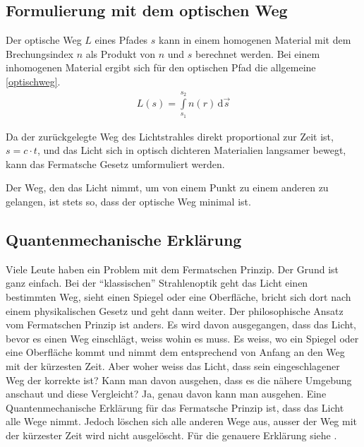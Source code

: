 \subsection{Formulierung mit dem optischen Weg}
Der optische Weg $L$  eines Pfades $s$ kann in einem homogenen Material 
mit dem Brechungsindex $n$ als Produkt von $n$ und $s$ berechnet werden.
Bei einem inhomogenen Material ergibt sich für den optischen Pfad die allgemeine \eqref{optischweg}.
\begin{align}
	L(s) = \int\limits_{s_1}^{s_2} n(r) \,\mathrm d\vec s 
	\label{optischweg}
\end{align}

Da der zurückgelegte Weg des Lichtstrahles direkt proportional zur Zeit ist, $s = c \cdot t$,
und das Licht sich in optisch dichteren Materialien langsamer bewegt,
kann das Fermatsche Gesetz umformuliert werden\cite{Definition}. 


\begin{definition}
Der Weg, den das Licht nimmt, um von einem Punkt zu einem anderen zu gelangen, ist stets so, dass der optische Weg minimal ist.
\end{definition}

\subsection{Quantenmechanische Erklärung}
Viele Leute haben ein Problem mit dem Fermatschen Prinzip. 
Der Grund ist ganz einfach. 
Bei der ``klassischen'' Strahlenoptik geht das Licht einen bestimmten Weg, 
sieht einen Spiegel oder eine Oberfläche, bricht sich dort nach einem 
physikalischen Gesetz und geht dann weiter.
Der philosophische Ansatz vom Fermatschen Prinzip ist anders. 
Es wird davon ausgegangen, dass das Licht, bevor es einen Weg einschlägt, 
weiss wohin es muss. Es weiss, wo ein Spiegel oder eine Oberfläche kommt und 
nimmt dem entsprechend von Anfang an den Weg mit der kürzesten Zeit.
Aber woher weiss das Licht, dass sein eingeschlagener Weg der korrekte ist?
Kann man davon ausgehen, dass es die nähere Umgebung anschaut und diese Vergleicht?
Ja, genau davon kann man ausgehen. Eine Quantenmechanische Erklärung für das Fermatsche Prinzip ist, 
dass das Licht alle Wege nimmt. Jedoch löschen sich alle anderen Wege aus, 
ausser der Weg mit der kürzester Zeit wird nicht ausgelöscht.
Für die genauere Erklärung siehe \cite{quanten}.
